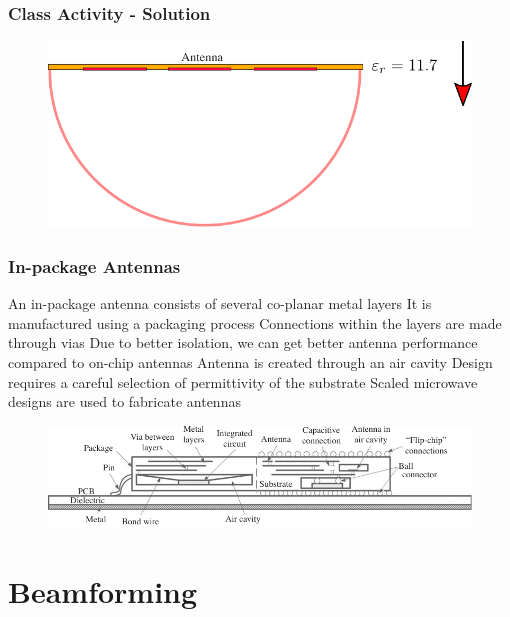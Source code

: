 \documentclass[10pt]{beamer}
\begin{document}
\begin{frame}
    \frametitle{Class Activity - Solution}

    \begin{figure}
        \centering
        \includegraphics[width=.75\textwidth]{exercise_solution.pdf}
    \end{figure}
\end{frame}


\begin{frame}
    \frametitle{In-package Antennas}
    \begin{outline}
        \1 An in-package antenna consists of several co-planar metal layers
        \1 It is manufactured using a packaging process
        \1 Connections within the layers are made through vias
        \1 Due to better isolation, we can get better antenna performance compared to on-chip antennas
        \1 Antenna is created through an air cavity
        \1 Design requires a careful selection of permittivity of the substrate
        \1 Scaled microwave designs are used to fabricate antennas
    \end{outline}
    \begin{figure}[htbp]
        \centering
        \includegraphics[width=.75\textwidth]{inpackage.pdf}
    \end{figure}
\end{frame}

\section{Beamforming}
\end{document}
